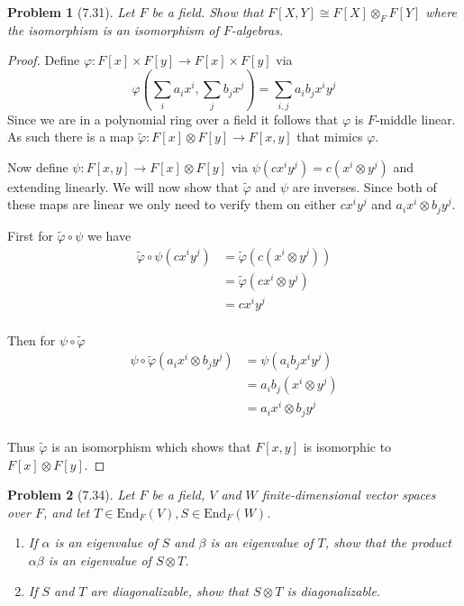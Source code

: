 \documentclass[10pt]{article}
\newcommand{\sk}{\vskip 10mm}
\newcommand{\wt}[1]{\widetilde{#1}}
\theoremstyle{plain}
\newtheorem{problem}{Problem}
\theoremstyle{remark}
\begin{document}
\sk


\begin{problem}[7.31]
  Let $F$ be a field. Show that $F[X,Y]\cong F[X]\otimes_F F[Y]$ where the
  isomorphism is an isomorphism of $F$-algebras.
\end{problem}

\begin{proof}
  Define $\varphi:F[x]\times F[y]\rightarrow F[x]\times F[y]$ via
  \[
    \varphi(\sum_i a_i x^i,\sum_j b_j x^j) = \sum_{i,j}a_i b_j x^i y^j
  \]
  Since we are in a polynomial ring over a field it follows that
  $\varphi$ is $F$-middle linear. As such there is a map
  $\wt{\varphi}:F[x]\otimes F[y]\rightarrow F[x,y]$ that mimics $\varphi$.

  Now define $\psi:F[x,y]\rightarrow F[x]\otimes F[y]$ via $\psi(cx^i y^j)=c(x^i\otimes y^j)$ and
  extending linearly. We will now show that $\wt{\varphi}$ and $\psi$ are
  inverses. Since both of these maps are linear we only need to
  verify them on either $cx^i y^j$ and $a_i x^i\otimes b_j y^j$.

  First for $\wt{\varphi}\circ \psi$ we have
  \begin{align*}
    \wt{\varphi}\circ\psi(cx^i y^j) &= \wt{\varphi}(c(x^i\otimes y^j))\\
                     &= \wt{\varphi}(cx^i\otimes y^j)\\
                     &= cx^i y^j\\
  \end{align*}

  Then for $\psi\circ\wt{\varphi}$
  \begin{align*}
    \psi\circ\wt{\varphi}(a_i x^i \otimes b_j y^j) &= \psi (a_i b_j x^i y^j)\\
                             &= a_i b_j (x^i\otimes y^j)\\
                             &= a_i x^i \otimes b_j y^j\\
  \end{align*}

  Thus $\wt{\varphi}$ is an isomorphism which shows that $F[x,y]$ is isomorphic
  to $F[x]\otimes F[y]$.
\end{proof}

\sk

\begin{problem}[7.34]
  Let $F$ be a field, $V$ and $W$ finite-dimensional vector spaces over $F$,
  and let $T\in\text{End}_F(V),S\in\text{End}_F(W)$.
  \begin{enumerate}
  \item[(a)] If $\alpha$ is an eigenvalue of $S$ and $\beta$ is an eigenvalue of
    $T$, show that the product $\alpha\beta$ is an eigenvalue of $S\otimes T$.
  \item[(b)] If $S$ and $T$ are diagonalizable, show that $S\otimes T$
    is diagonalizable.
  \end{enumerate}
\end{problem}
\end{document}
